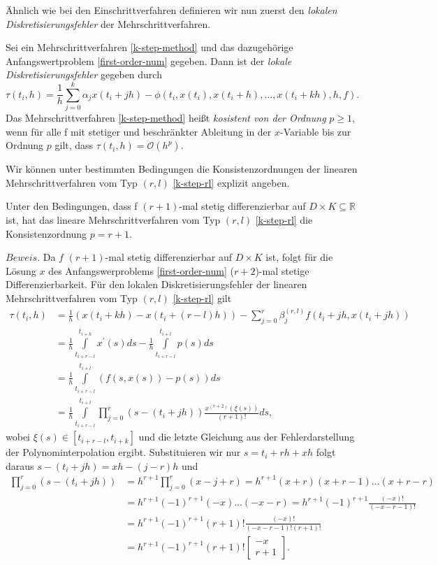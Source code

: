 Ähnlich wie bei den Einschrittverfahren definieren wir nun zuerst den {\em lokalen Diskretisierungsfehler} der
Mehrschrittverfahren.
\begin{definition}
    Sei ein Mehrschrittverfahren \eqref{k-step-method} und das dazugehörige Anfangswertproblem \eqref{first-order-num}
    gegeben. Dann ist der {\em lokale Diskretisierungsfehler} gegeben durch
    \[
        \tau(t_i,h) = \frac{1}{h} \sum_{j=0}^{k} \alpha_j x(t_i + jh) -
        \phi (t_i,x(t_i), x(t_i+h), \dots, x(t_i+kh),h,f).
    \]
    Das Mehrschrittverfahren \eqref{k-step-method} heißt {\em kosistent von der Ordnung} $p\geq 1$, wenn für alle f mit
    stetiger und beschränkter Ableitung in der $x$-Variable bis zur Ordnung $p$ gilt, dass
    $\tau(t_i,h) = \mathcal{O}(h^p)$.
\end{definition}
Wir können unter bestimmten Bedingungen die Konsistenzordnungen der linearen Mehrschrittverfahren vom Typ $(r,l)$
\eqref{k-step-rl} explizit angeben.
\begin{satz}
    Unter den Bedingungen, dass f $(r+1)$-mal stetig differenzierbar auf $D \times K \subseteq \mathbb{R}$ ist, hat
    das lineare Mehrschrittverfahren vom Typ $(r,l)$ \eqref{k-step-rl} die Konsistenzordnung $p=r+1$.
\end{satz}
$Beweis.$ Da $f$ $(r+1)$-mal stetig differenzierbar auf $D \times K$ ist, folgt für die Lösung $x$ des Anfangswerproblems
\eqref{first-order-num} ($r+2$)-mal stetige Differenzierbarkeit. Für den lokalen Diskretisierungsfehler der linearen
Mehrschrittverfahren vom Typ $(r,l)$ \eqref{k-step-rl} gilt
\begin{align*}
    \tau(t_i, h) &= \frac{1}{h} (x(t_i + kh) - x(t_i + (r-l)h)) -
    \sum\limits_{j=0}^{r}\beta_j^{(r,l)}f(t_i+jh, x(t_i +jh))\\
    &= \frac{1}{h} \int\limits_{t_{i+r-l}}^{t_{i+k}} x^{\prime}(s)ds -
    \frac{1}{h} \int\limits_{t_{i+r-l}}^{t_{i+l}} p(s) ds \\
    &= \frac{1}{h} \int\limits_{t_{i+r-l}}^{t_{i+l}} \left( f(s,x(s)) - p(s) \right) ds \\
    &= \frac{1}{h} \int\limits_{t_{i+r-l}}^{t_{i+l}} \prod\limits_{j=0}^{r} (s - (t_i + jh))
    \frac{x^{(r+2)}(\xi(s))}{(r+1)!} ds,
\end{align*}
wobei $\xi(s) \in [t_{i+r-l}, t_{i+k}]$ und die letzte Gleichung aus der Fehlerdarstellung der Polynominterpolation
ergibt. Substituieren wir nur $s = t_i + rh + xh$ folgt daraus $s- (t_i +jh) = xh - (j-r)h$ und
\begin{align*}
    \prod\limits_{j=0}^{r} (s - (t_i +jh)) &= h^{r+1} \prod\limits_{j=0}^{r} (x-j+r) = h^{r+1}(x+r)(x+r-1) \dots (x+r-r)\\
    &= h^{r+1}(-1)^{r+1}(-x)\dots (-x-r) = h^{r+1}(-1)^{r+1}\frac{(-x)!}{(-x-r-1)!}\\
    &= h^{r+1}(-1)^{r+1}(r+1)! \frac{(-x)!}{(-x-r-1)!(r+1)!}\\
    &= h^{r+1}(-1)^{r+1}(r+1)! \begin{bmatrix}
                                   -x \\
                                   r+1
    \end{bmatrix}.
\end{align*}
